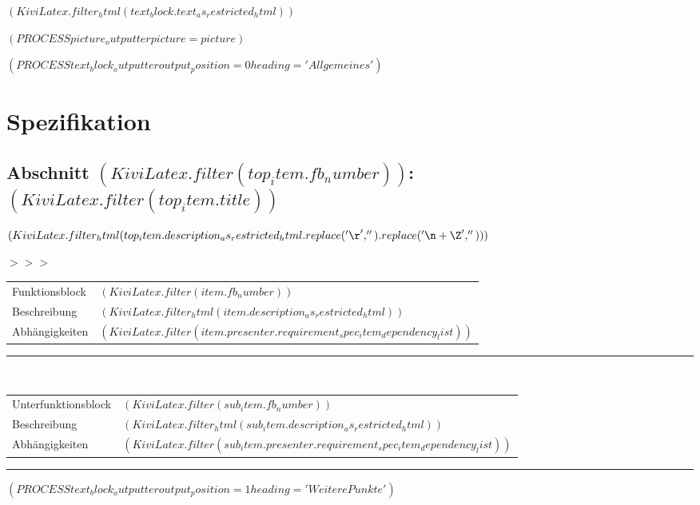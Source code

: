 \documentclass{scrartcl}
\begin{document}
$( KiviLatex.filter_html(text_block.text_as_restricted_html) )$

$( PROCESS picture_outputter picture=picture )$


$( PROCESS text_block_outputter output_position=0 heading='Allgemeines' )$

\newpage

\section{Spezifikation}

\setlength{\LTpre}{-0.3cm}



\subsection{Abschnitt $( KiviLatex.filter(top_item.fb_number) )$: $( KiviLatex.filter(top_item.title) )$}

$( KiviLatex.filter_html(top_item.description_as_restricted_html.replace('\r', '').replace('\n+\Z', '')) )$

\vspace{0.5cm}
\parbox[t]{1.0cm}{\textcolor{kivitendodarkred}{$>>>$}}%
\parbox[t]{15.0cm}{%
  \begin{longtable}{p{2.8cm}p{11.7cm}}
    Funktionsblock & $( KiviLatex.filter(item.fb_number) )$                                       \\
    Beschreibung   & $( KiviLatex.filter_html(item.description_as_restricted_html) )$             \\
    Abhängigkeiten & $( KiviLatex.filter(item.presenter.requirement_spec_item_dependency_list) )$
  \end{longtable}}

\hspace*{1.15cm}\rule{15.2cm}{0.2pt}\\
\hspace*{1.0cm}%
\parbox[t]{15.0cm}{%
  \begin{longtable}{p{2.8cm}p{11.7cm}}
    Unterfunktionsblock & $( KiviLatex.filter(sub_item.fb_number) )$                                       \\
    Beschreibung        & $( KiviLatex.filter_html(sub_item.description_as_restricted_html) )$             \\
    Abhängigkeiten      & $( KiviLatex.filter(sub_item.presenter.requirement_spec_item_dependency_list) )$
  \end{longtable}}


\vspace{0.2cm}
\hrule
\vspace{0.4cm}


%

$( PROCESS text_block_outputter output_position=1 heading='Weitere Punkte' )$
\end{document}
